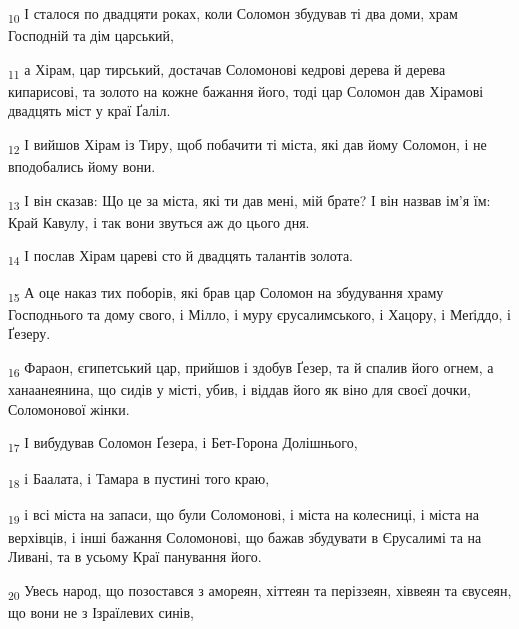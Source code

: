 \begin{tcolorbox}
\textsubscript{10} І сталося по двадцяти роках, коли Соломон збудував ті два доми, храм Господній та дім царський,
\end{tcolorbox}
\begin{tcolorbox}
\textsubscript{11} а Хірам, цар тирський, достачав Соломонові кедрові дерева й дерева кипарисові, та золото на кожне бажання його, тоді цар Соломон дав Хірамові двадцять міст у краї Ґаліл.
\end{tcolorbox}
\begin{tcolorbox}
\textsubscript{12} І вийшов Хірам із Тиру, щоб побачити ті міста, які дав йому Соломон, і не вподобались йому вони.
\end{tcolorbox}
\begin{tcolorbox}
\textsubscript{13} І він сказав: Що це за міста, які ти дав мені, мій брате? І він назвав ім'я їм: Край Кавулу, і так вони звуться аж до цього дня.
\end{tcolorbox}
\begin{tcolorbox}
\textsubscript{14} І послав Хірам цареві сто й двадцять талантів золота.
\end{tcolorbox}
\begin{tcolorbox}
\textsubscript{15} А оце наказ тих поборів, які брав цар Соломон на збудування храму Господнього та дому свого, і Мілло, і муру єрусалимського, і Хацору, і Меґіддо, і Ґезеру.
\end{tcolorbox}
\begin{tcolorbox}
\textsubscript{16} Фараон, єгипетський цар, прийшов і здобув Ґезер, та й спалив його огнем, а ханаанеянина, що сидів у місті, убив, і віддав його як віно для своєї дочки, Соломонової жінки.
\end{tcolorbox}
\begin{tcolorbox}
\textsubscript{17} І вибудував Соломон Ґезера, і Бет-Горона Долішнього,
\end{tcolorbox}
\begin{tcolorbox}
\textsubscript{18} і Баалата, і Тамара в пустині того краю,
\end{tcolorbox}
\begin{tcolorbox}
\textsubscript{19} і всі міста на запаси, що були Соломонові, і міста на колесниці, і міста на верхівців, і інші бажання Соломонові, що бажав збудувати в Єрусалимі та на Ливані, та в усьому Краї панування його.
\end{tcolorbox}
\begin{tcolorbox}
\textsubscript{20} Увесь народ, що позостався з амореян, хіттеян та періззеян, хіввеян та євусеян, що вони не з Ізраїлевих синів,
\end{tcolorbox}
